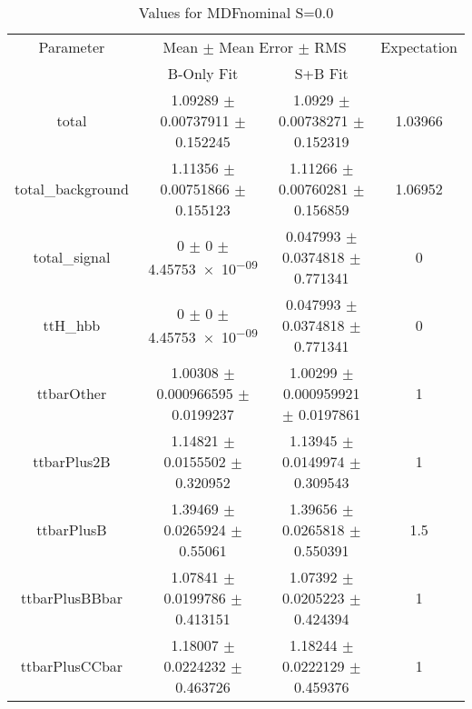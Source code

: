 \begin{table}
\centering
\caption{Values for MDFnominal S=0.0}
\begin{tabular}{cccc}
\toprule
Parameter & \multicolumn{2}{c}{Mean $\pm$ Mean Error $\pm$ RMS} & Expectation\\
 & B-Only Fit & S+B Fit & \\
\midrule
total & \num{1.09289} $\pm$ \num{0.00737911} $\pm$ \num{0.152245} & \num{1.0929} $\pm$ \num{0.00738271} $\pm$ \num{0.152319} & \num{1.03966}\\
total\_background & \num{1.11356} $\pm$ \num{0.00751866} $\pm$ \num{0.155123} & \num{1.11266} $\pm$ \num{0.00760281} $\pm$ \num{0.156859} & \num{1.06952}\\
total\_signal & \num{0} $\pm$ \num{0} $\pm$ \num{4.45753e-09} & \num{0.047993} $\pm$ \num{0.0374818} $\pm$ \num{0.771341} & \num{0}\\
ttH\_hbb & \num{0} $\pm$ \num{0} $\pm$ \num{4.45753e-09} & \num{0.047993} $\pm$ \num{0.0374818} $\pm$ \num{0.771341} & \num{0}\\
ttbarOther & \num{1.00308} $\pm$ \num{0.000966595} $\pm$ \num{0.0199237} & \num{1.00299} $\pm$ \num{0.000959921} $\pm$ \num{0.0197861} & \num{1}\\
ttbarPlus2B & \num{1.14821} $\pm$ \num{0.0155502} $\pm$ \num{0.320952} & \num{1.13945} $\pm$ \num{0.0149974} $\pm$ \num{0.309543} & \num{1}\\
ttbarPlusB & \num{1.39469} $\pm$ \num{0.0265924} $\pm$ \num{0.55061} & \num{1.39656} $\pm$ \num{0.0265818} $\pm$ \num{0.550391} & \num{1.5}\\
ttbarPlusBBbar & \num{1.07841} $\pm$ \num{0.0199786} $\pm$ \num{0.413151} & \num{1.07392} $\pm$ \num{0.0205223} $\pm$ \num{0.424394} & \num{1}\\
ttbarPlusCCbar & \num{1.18007} $\pm$ \num{0.0224232} $\pm$ \num{0.463726} & \num{1.18244} $\pm$ \num{0.0222129} $\pm$ \num{0.459376} & \num{1}\\
\bottomrule
\end{tabular}
\end{table}